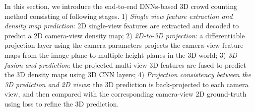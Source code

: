 \documentclass[letterpaper]{article}
\begin{document}
In this section, we introduce the end-to-end DNNs-based 3D crowd counting method %
consisting of following stages. 1) \emph{Single view feature extraction and density map prediction}: 2D single-view features are extracted and  decoded to predict a 2D camera-view density map; 2) \emph{2D-to-3D projection}: a differentiable projection layer using the camera parameters projects the camera-view feature maps from the image plane to multiple height-planes in the 3D world; 3) \emph{3D fusion and prediction}: the projected multi-view 3D features are fused to predict the 3D density maps using 3D CNN layers; 4) \emph{Projection consistency between the 3D prediction and 2D views}: the 3D prediction is back-projected to each camera view, %
and then compared with the corresponding camera-view 2D ground-truth using loss to refine the 3D prediction.
\end{document}
